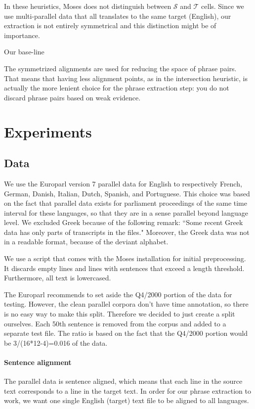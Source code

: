 \documentclass[11pt]{article}
\begin{document}
In these heuristics, Moses does not distinguish between $\mathcal S$ and $\mathcal T$ cells. Since we use multi-parallel data that all translates to the same target (English), our extraction is not entirely symmetrical and this distinction might be of importance. 

Our base-line 

The symmetrized alignments are used for reducing the space of phrase pairs. That means that having less alignment points, as in the intersection heuristic, is actually the more lenient choice for the phrase extraction step: you do not discard phrase pairs based on weak evidence. 



\section{Experiments}

\subsection{Data}

We use the Europarl version 7 parallel data for English to respectively French, German, Danish, Italian, Dutch, Spanish, and Portuguese. This choice was based on the fact that parallel data exists for parliament proceedings of the same time interval for these languages, so that they are in a sense parallel beyond language level.
We excluded Greek because of the following remark: ``Some recent Greek data has only parts of transcripts in the files." Moreover, the Greek data was not in a readable format, because of the deviant alphabet.

We use a script that comes with the Moses installation for initial preprocessing. It discards empty lines and lines with sentences that exceed a length threshold. Furthermore, all text is lowercased.

The Europarl recommends to set aside the Q4/2000 portion of the data for testing. However, the clean parallel corpora don't have time annotation, so there is no easy way to make this split. Therefore we decided to just create a split ourselves. Each 50th sentence is removed from the corpus and added to a separate test file. The ratio is based on the fact that the Q4/2000 portion would be 3/(16*12-4)=0.016 of the data.


\paragraph{Sentence alignment}
The parallel data is sentence aligned, which means that each line in the source text corresponds to a line in the target text.
In order for our phrase extraction to work, we want one single English (target) text file to be aligned to all languages.
\end{document}
